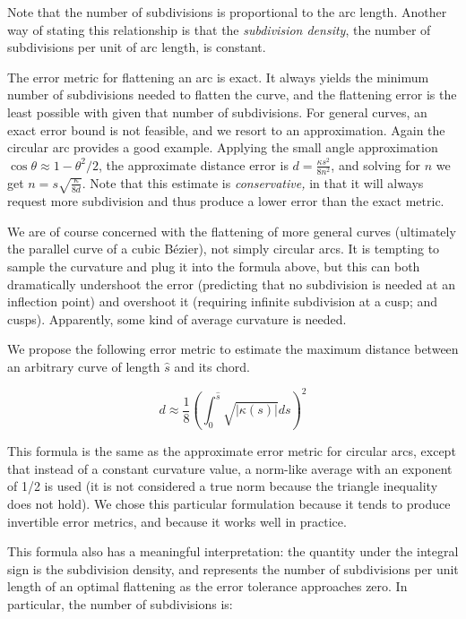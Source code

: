 \documentclass[format=acmsmall]{acmart}
\begin{document}
Note that the number of subdivisions is proportional to the arc length. Another way of stating this relationship is that the \emph{subdivision density}, the number of subdivisions per unit of arc length, is constant.

The error metric for flattening an arc is exact. It always yields the minimum number of subdivisions needed to flatten the curve, and the flattening error is the least possible with given that number of subdivisions. For general curves, an exact error bound is not feasible, and we resort to an approximation. Again the circular arc provides a good example. Applying the small angle approximation $\cos \theta \approx 1 - \theta^2/2$, the approximate distance error is $d = \frac{\kappa s^2}{8n^2}$, and solving for $n$ we get $n = s\sqrt{\frac{\kappa}{8d}}$. Note that this estimate is \emph{conservative,} in that it will always request more subdivision and thus produce a lower error than the exact metric.

We are of course concerned with the flattening of more general curves (ultimately the parallel curve of a cubic Bézier), not simply circular arcs. It is tempting to sample the curvature and plug it into the formula above, but this can both dramatically undershoot the error (predicting that no subdivision is needed at an inflection point) and overshoot it (requiring infinite subdivision at a cusp; and cusps). Apparently, some kind of average curvature is needed.

We propose the following error metric to estimate the maximum distance between an arbitrary curve of length $\hat{s}$ and its chord. 

\[
    d \approx \frac{1}{8}\left(\int_0^{\hat{s}} \sqrt{|\kappa(s)|}ds \right)^2
\]


This formula is the same as the approximate error metric for circular arcs, except that instead of a constant curvature value, a norm-like average with an exponent of 1/2 is used (it is not considered a true norm because the triangle inequality does not hold). We chose this particular formulation because it tends to produce invertible error metrics, and because it works well in practice.

This formula also has a meaningful interpretation: the quantity under the integral sign is the subdivision density, and represents the number of subdivisions per unit length of an optimal flattening as the error tolerance approaches zero. In particular, the number of subdivisions is:
\end{document}
